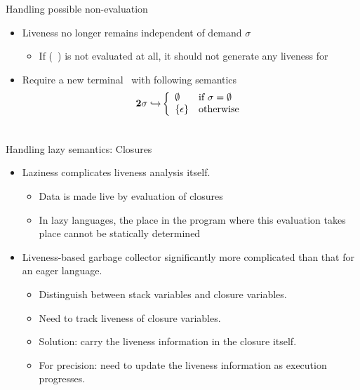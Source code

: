 \documentclass[xcolor=x11names,compress,mathserif]{beamer}
\renewcommand{\(}{\begin{columns}}
\renewcommand{\)}{\end{columns}}
\newcommand{\<}[1]{\begin{column}{#1}}
\renewcommand{\>}{\end{column}}
\begin{document}
\begin{frame} {Handling possible non-evaluation}
  \begin{itemize}
  \item Liveness no longer remains independent of demand $\sigma$ \\
    \begin{itemize}
    \item If (\CAR~\px) is not evaluated at all, it should not generate any liveness for \px
    \end{itemize}
  \item Require a new terminal \clazy\ with following semantics
    \begin{align*}
      {\mathbf{2}}\sigma \hookrightarrow & \left\{ 
      \begin{array}{ll}
        \emptyset&\mbox{if}~\sigma = \emptyset\\
        \{\epsilon\} & \mbox{otherwise}
      \end{array}\right.\\ & \\
    \end{align*}
  \end{itemize}
\end{frame}
\begin{frame}{Handling lazy semantics: Closures}
\normalsize
  \begin{itemize}\itemsep2em
  \item Laziness complicates liveness analysis itself. 
    \begin{itemize}
    \item Data is made live by evaluation of closures
    \item In lazy languages, the place in the program
      where this evaluation takes place cannot be statically determined
    \end{itemize}
    \pause
  \item Liveness-based garbage collector significantly more complicated than that for an eager language.
    \begin{itemize}
    \item Distinguish between stack variables and closure variables.
    \item Need to track liveness of closure variables.
    \item Solution: carry the liveness information in the closure itself.
    \item For precision: need to update the liveness information as execution progresses.
    \end{itemize}
  \end{itemize}
\end{frame}
\end{document}

